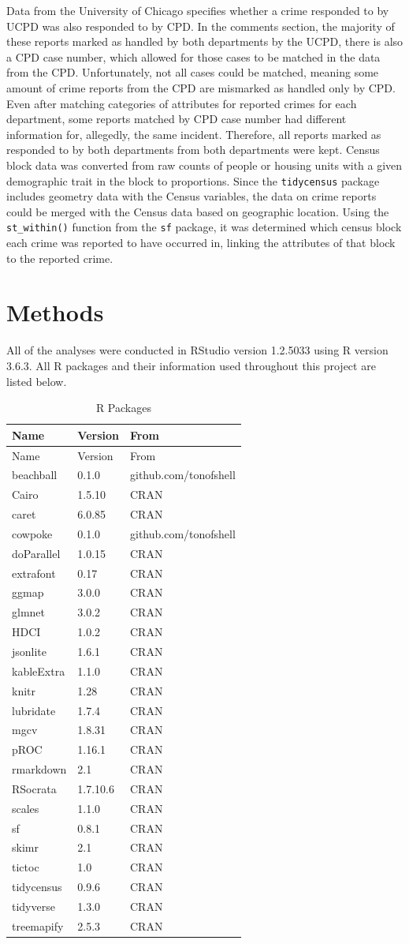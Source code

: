 \documentclass{ucetd}
\begin{document}
Data from the University of Chicago specifies whether a crime responded
to by UCPD was also responded to by CPD. In the comments section, the
majority of these reports marked as handled by both departments by the
UCPD, there is also a CPD case number, which allowed for those cases to
be matched in the data from the CPD. Unfortunately, not all cases could
be matched, meaning some amount of crime reports from the CPD are
mismarked as handled only by CPD. Even after matching categories of
attributes for reported crimes for each department, some reports matched
by CPD case number had different information for, allegedly, the same
incident. Therefore, all reports marked as responded to by both
departments from both departments were kept. Census block data was
converted from raw counts of people or housing units with a given
demographic trait in the block to proportions. Since the
\texttt{tidycensus} package includes geometry data with the Census
variables, the data on crime reports could be merged with the Census
data based on geographic location. Using the \texttt{st\_within()}
function from the \texttt{sf} package, it was determined which census
block each crime was reported to have occurred in, linking the
attributes of that block to the reported crime.

\hypertarget{methods}{%
\section{Methods}\label{methods}}

All of the analyses were conducted in RStudio version 1.2.5033 using R
version 3.6.3. All R packages and their information used throughout this
project are listed below.

\begin{longtable}[]{@{}lll@{}}
\caption{R Packages}\tabularnewline
\toprule
Name & Version & From\tabularnewline
\midrule
\endfirsthead
\toprule
Name & Version & From\tabularnewline
\midrule
\endhead
beachball & 0.1.0 & github.com/tonofshell\tabularnewline
Cairo & 1.5.10 & CRAN\tabularnewline
caret & 6.0.85 & CRAN\tabularnewline
cowpoke & 0.1.0 & github.com/tonofshell\tabularnewline
doParallel & 1.0.15 & CRAN\tabularnewline
extrafont & 0.17 & CRAN\tabularnewline
ggmap & 3.0.0 & CRAN\tabularnewline
glmnet & 3.0.2 & CRAN\tabularnewline
HDCI & 1.0.2 & CRAN\tabularnewline
jsonlite & 1.6.1 & CRAN\tabularnewline
kableExtra & 1.1.0 & CRAN\tabularnewline
knitr & 1.28 & CRAN\tabularnewline
lubridate & 1.7.4 & CRAN\tabularnewline
mgcv & 1.8.31 & CRAN\tabularnewline
pROC & 1.16.1 & CRAN\tabularnewline
rmarkdown & 2.1 & CRAN\tabularnewline
RSocrata & 1.7.10.6 & CRAN\tabularnewline
scales & 1.1.0 & CRAN\tabularnewline
sf & 0.8.1 & CRAN\tabularnewline
skimr & 2.1 & CRAN\tabularnewline
tictoc & 1.0 & CRAN\tabularnewline
tidycensus & 0.9.6 & CRAN\tabularnewline
tidyverse & 1.3.0 & CRAN\tabularnewline
treemapify & 2.5.3 & CRAN\tabularnewline
\bottomrule
\end{longtable}
\end{document}
